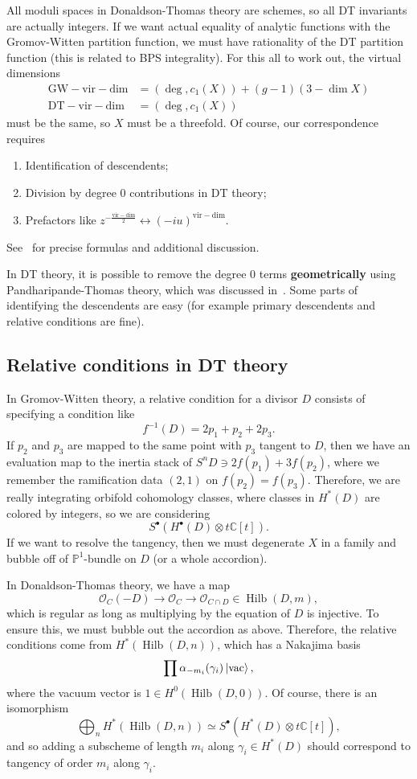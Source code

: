 \documentclass[leqno, openany]{memoir}
\theoremstyle{definition}
\theoremstyle{remark}
\theoremstyle{plain}
\theoremstyle{definition}
\theoremstyle{remark}
\newcommand{\C}{\mathbb{C}}
\renewcommand{\P}{\mathbb{P}}
\newcommand{\mc}[1]{\mathcal{#1}}
\newcommand{\mr}[1]{\mathrm{#1}}
\DeclareMathOperator{\Hilb}{Hilb}
\begin{document}
All moduli spaces in Donaldson-Thomas theory are schemes, so all DT invariants are actually integers. If we want actual equality of analytic functions with the Gromov-Witten partition function, we must have rationality of the DT partition function (this is related to BPS integrality). For this all to work out, the virtual dimensions
\begin{align*}
    \mr{GW-vir-dim} &= (\deg, c_1(X)) + (g-1)(3-\dim X) \\
    \mr{DT-vir-dim} &= (\deg, c_1(X))
\end{align*}
must be the same, so $X$ must be a threefold. Of course, our correspondence requires
\begin{enumerate}
    \item Identification of descendents;
    \item Division by degree $0$ contributions in DT theory;
    \item Prefactors like $z^{-\frac{\mr{vir-dim}}{2}} \leftrightarrow (-iu)^{\mr{vir-dim}}$.
\end{enumerate}
See~\cite{takagidt} for precise formulas and additional discussion.

In DT theory, it is possible to remove the degree $0$ terms \textbf{geometrically} using Pandharipande-Thomas theory, which was discussed in~. Some parts of identifying the descendents are easy (for example primary descendents and relative conditions are fine). 

\subsection{Relative conditions in DT theory}

In Gromov-Witten theory, a relative condition for a divisor $D$ consists of specifying a condition like 
\[ f^{-1}(D) = 2p_1 + p_2 + 2 p_3. \] 
If $p_2$ and $p_3$ are mapped to the same point with $p_3$ tangent to $D$, then we have an evaluation map to the inertia stack of $S^n D \ni 2 f(p_1) + 3 f(p_2)$, where we remember the ramification data $(2,1)$ on $f(p_2) = f(p_3)$. Therefore, we are really integrating orbifold cohomology classes, where classes in $H^*(D)$ are colored by integers, so we are considering
\[ S^{\bullet} (H^{\bullet}(D) \otimes t \C[t]). \]
If we want to resolve the tangency, then we must degenerate $X$ in a family and bubble off of $\P^1$-bundle on $D$ (or a whole accordion).

In Donaldson-Thomas theory, we have a map
\[ \mc{O}_C(-D) \to \mc{O}_C \to \mc{O}_{C \cap D} \in \Hilb(D, m), \]
which is regular as long as multiplying by the equation of $D$ is injective. To ensure this, we must bubble out the accordion as above. Therefore, the relative conditions come from $H^*(\Hilb(D, n))$, which has a Nakajima basis
\[ \prod \alpha_{-m_i}(\gamma_i) \ket{\mr{vac}}, \]
where the vacuum vector is $1 \in H^0(\Hilb(D, 0))$. Of course, there is an isomorphism
\[ \bigoplus_n H^*(\Hilb(D, n)) \simeq S^{\bullet}(H^*(D) \otimes t \C[t]), \]
and so adding a subscheme of length $m_i$ along $\gamma_i \in H^*(D)$ should correspond to tangency of order $m_i$ along $\gamma_i$.
\end{document}
